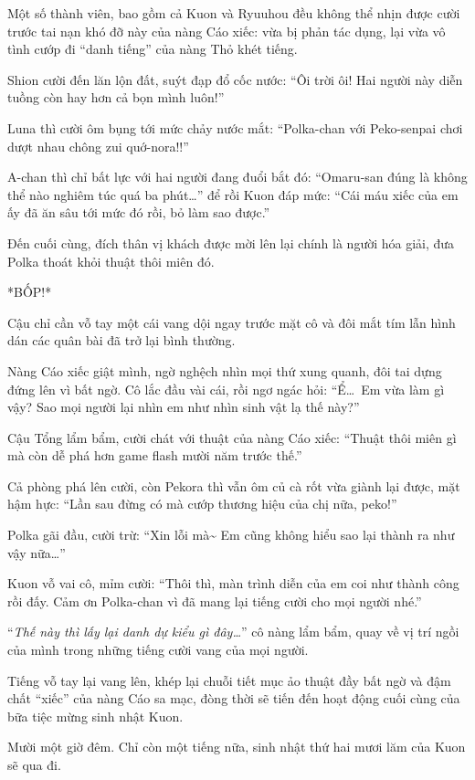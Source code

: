 \documentclass[../main.tex]{subfiles}
\begin{document}
Một số thành viên, bao gồm cả Kuon và Ryuuhou đều không thể nhịn được cười trước tai nạn khó đỡ này của nàng Cáo xiếc: vừa bị phản tác dụng, lại vừa vô tình cướp đi ``danh tiếng'' của nàng Thỏ khét tiếng.

Shion cười đến lăn lộn đất, suýt đạp đổ cốc nước: ``Ôi trời ôi! Hai người này diễn tuồng còn hay hơn cả bọn mình luôn!''

Luna thì cười ôm bụng tới mức chảy nước mắt: ``Polka-chan với Peko-senpai chơi dượt nhau chông zui quớ-nora!!''

A-chan thì chỉ bất lực với hai người đang đuổi bắt đó: ``Omaru-san đúng là không thể nào nghiêm túc quá ba phút\dots'' để rồi Kuon đáp mức: ``Cái máu xiếc của em ấy đã ăn sâu tới mức đó rồi, bỏ làm sao được.''

Đến cuối cùng, đích thân vị khách được mời lên lại chính là người hóa giải, đưa Polka thoát khỏi thuật thôi miên đó.

*BỐP!*

Cậu chỉ cần vỗ tay một cái vang dội ngay trước mặt cô và đôi mắt tím lẫn hình dán các quân bài đã trở lại bình thường.

Nàng Cáo xiếc giật mình, ngờ nghệch nhìn mọi thứ xung quanh, đôi tai dựng đứng lên vì bất ngờ. Cô lắc đầu vài cái, rồi ngơ ngác hỏi: ``Ể\dots\ Em vừa làm gì vậy? Sao mọi người lại nhìn em như nhìn sinh vật lạ thế này?''

Cậu Tổng lẩm bẩm, cười chát với thuật của nàng Cáo xiếc: ``Thuật thôi miên gì mà còn dễ phá hơn game flash mười năm trước thế.''

Cả phòng phá lên cười, còn Pekora thì vẫn ôm củ cà rốt vừa giành lại được, mặt hậm hực: ``Lần sau đừng có mà cướp thương hiệu của chị nữa, peko!''

Polka gãi đầu, cười trừ: ``Xin lỗi mà\~{} Em cũng không hiểu sao lại thành ra như vậy nữa\dots''

Kuon vỗ vai cô, mỉm cười: ``Thôi thì, màn trình diễn của em coi như thành công rồi đấy. Cảm ơn Polka-chan vì đã mang lại tiếng cười cho mọi người nhé.''

``\textit{Thế này thì lấy lại danh dự kiểu gì đây\dots}'' cô nàng lẩm bẩm, quay về vị trí ngồi của mình trong những tiếng cười vang của mọi người.

Tiếng vỗ tay lại vang lên, khép lại chuỗi tiết mục ảo thuật đầy bất ngờ và đậm chất ``xiếc'' của nàng Cáo sa mạc, đòng thời sẽ tiến đến hoạt động cuối cùng của bữa tiệc mừng sinh nhật Kuon.

\ct

Mười một giờ đêm. Chỉ còn một tiếng nữa, sinh nhật thứ hai mươi lăm của Kuon sẽ qua đi.
\end{document}
